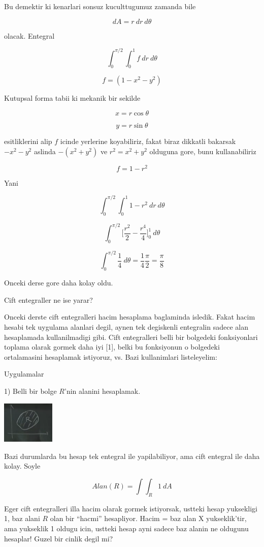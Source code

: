 \documentclass[12pt,fleqn]{article}\usepackage{../common}
\begin{document}
Bu demektir ki kenarlari sonsuz kuculttugumuz zamanda bile 

\[ dA = r \ dr \ d\theta \]

olacak. Entegral

\[ \int_0^{\pi/2} \int_0^1  f \ dr \ d\theta\]

\[ f =  (1-x^2-y^2)\]

Kutupsal forma tabii ki mekanik bir sekilde

\[ x = r\cos\theta \]

\[ y = r\sin\theta \]

esitliklerini alip $f$ icinde yerlerine koyabiliriz, fakat biraz dikkatli
bakarsak $-x^2-y^2$ aslinda $-(x^2+y^2)$ ve $r^2=x^2+y^2$ olduguna gore,
bunu kullanabiliriz

\[ f =   1-r^2 \]

Yani

\[ \int_0^{\pi/2} \int_0^1  1-r^2 \ dr \ d\theta\]


\[ \int_0^{\pi/2}  \bigg[ \frac{r^2}{2} - \frac{r^4}{4} \bigg]_0^1 \ d\theta\]


\[ \int_0^{\pi/2}  \frac{1}{4} \ d\theta = \frac{1}{4} \frac{\pi}{2} =
\frac{\pi}{8}
\]

Onceki derse gore daha kolay oldu. 

Cift entegraller ne ise yarar? 

Onceki derste cift entegralleri hacim hesaplama baglaminda isledik. Fakat
hacim hesabi tek uygulama alanlari degil, aynen tek degiskenli entegralin
sadece alan hesaplamada kullanilmadigi gibi. Cift entegralleri
belli bir bolgedeki fonksiyonlari toplama olarak gormek daha iyi [1], belki bu
fonksiyonun o bolgedeki ortalamasini hesaplamak istiyoruz, vs. Bazi
kullanimlari listeleyelim:

Uygulamalar 

1) Belli bir bolge $R$'nin alanini hesaplamak. 

\includegraphics[height=2cm]{17_3.png}

Bazi durumlarda bu hesap tek entegral ile yapilabiliyor, ama cift entegral
ile daha kolay. Soyle

\[ Alan(R) = \int \int_R 1 \ dA \]

Eger cift entegralleri illa hacim olarak gormek istiyorsak, ustteki hesap
yuksekligi 1, baz alani $R$ olan bir ``hacmi'' hesapliyor. Hacim = baz alan
X yukseklik'tir, ama yukseklik 1 oldugu icin, ustteki hesap ayni sadece baz
alanin ne oldugunu hesaplar! Guzel bir cinlik degil mi?
\end{document}
